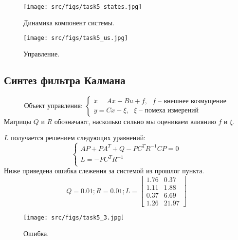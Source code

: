 \begin{figure}[ht!]
        \centering
        \texttt{[image: src/figs/task5\_states.jpg]}
        \caption{Динамика компонент системы.}
        \label{fig:task5_states}
\end{figure}

\begin{figure}[ht!]
        \centering
        \texttt{[image: src/figs/task5\_us.jpg]}
        \caption{Управление.}
        \label{fig:task5_u}
\end{figure}
\FloatBarrier

\subsection{Синтез фильтра Калмана}
\[      
        \text{Объект управления: }
        \begin{cases}
                \dot{x} = A x + Bu + f, \text{ \(f\) -- внешнее возмущение}\\
                y = Cx + \xi, \text{ \(\xi\) -- помеха измерений}
        \end{cases} 
\]
Матрицы \(Q\) и \(R\) обозначают, насколько сильно мы оцениваем влиянию \(f\) и \(\xi\).

\(L\) получается решением следующих уравнений:
\[
\begin{cases}
    A P + P A^T + Q - PC^TR^{-1}CP = 0\\
    L = -P C^T R^{-1}\\
\end{cases}
\]
Ниже приведена ошибка слежения за системой из прошлог пункта.
\[Q = 0.01; R = 0.01; L = \begin{bmatrix}
        1.76 &  0.37\\
        1.11 &  1.88\\
        0.37 &  6.69\\
        1.26 &  21.97
      \end{bmatrix}\]
\begin{figure}[ht!]
        \centering
        \texttt{[image: src/figs/task5\_3.jpg]}
        \caption{Ошибка.}
        \label{fig:task5_3}
\end{figure}
\FloatBarrier

